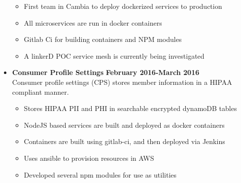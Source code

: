 \documentclass[overlapped]{res}
\begin{document}
\begin{resume}
\begin{itemize}[leftmargin=0in]
\begin{samepage}
\begin{itemize}
                    \item[\textbullet] First team in Cambia to deploy dockerized services to production
                    \item[\textbullet] All microservices are run in docker containers
                    \item[\textbullet] Gitlab Ci for building containers and NPM modules
                    \item[\textbullet] A linkerD POC service mesh is currently being investigated
                \end{itemize}
            \end{samepage}
            \vspace{0.125in}
        \item[] 
            \begin{samepage}
                \textbf{Consumer Profile Settings} \hfill \textbf{February 2016-March 2016} \\
                Consumer profile settings (CPS) stores member information in a HIPAA compliant manner.
                \begin{itemize}
                    \item[\textbullet] Stores HIPAA PII and PHI in searchable encrypted dynamoDB tables
                    \item[\textbullet] NodeJS based services are built and deployed as docker containers
                    \item[\textbullet] Containers are built using gitlab-ci, and then deployed via Jenkins
                    \item[\textbullet] Uses ansible to provision resources in AWS
                    \item[\textbullet] Developed several npm modules for use as utilities
                \end{itemize}
            \end{samepage}
            \vspace{0.125in}
\end{itemize}
\vspace{0.25in}


\end{resume}
\end{document}
